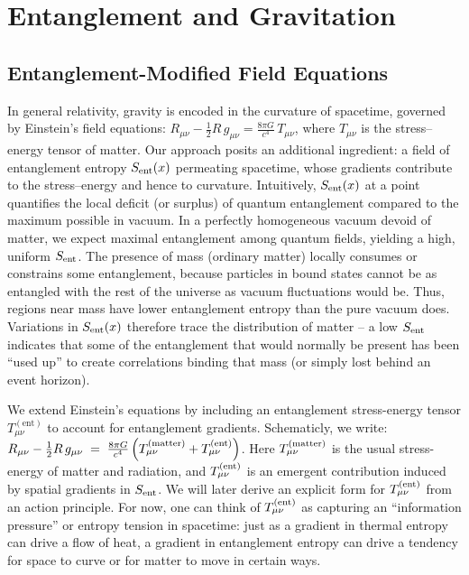 \documentclass[11pt]{article}
\begin{document}
\section{Entanglement and Gravitation}

\subsection{Entanglement-Modified Field Equations}

In general relativity, gravity is encoded in the curvature of spacetime, governed by Einstein’s field equations: 
$R_{\mu\nu} - \tfrac{1}{2}R\,g_{\mu\nu} = \frac{8\pi G}{c^4}\,T_{\mu\nu}$, 
where $T_{\mu\nu}$ is the stress–energy tensor of matter. Our approach posits an additional ingredient: a field of entanglement entropy $S_{\rm ent}(x)$ permeating spacetime, whose gradients contribute to the stress–energy and hence to curvature. Intuitively, $S_{\rm ent}(x)$ at a point quantifies the local deficit (or surplus) of quantum entanglement compared to the maximum possible in vacuum. In a perfectly homogeneous vacuum devoid of matter, we expect maximal entanglement among quantum fields, yielding a high, uniform $S_{\rm ent}$. The presence of mass (ordinary matter) locally consumes or constrains some entanglement, because particles in bound states cannot be as entangled with the rest of the universe as vacuum fluctuations would be. Thus, regions near mass have lower entanglement entropy than the pure vacuum does. Variations in $S_{\rm ent}(x)$ therefore trace the distribution of matter – a low $S_{\rm ent}$ indicates that some of the entanglement that would normally be present has been “used up” to create correlations binding that mass (or simply lost behind an event horizon).

We extend Einstein’s equations by including an entanglement stress-energy tensor $T_{\mu\nu}^{(\text{ent})}$ to account for entanglement gradients. Schematicly, we write: 
$R_{\mu\nu} - \tfrac{1}{2}R\,g_{\mu\nu} \;=\; \frac{8\pi G}{c^4}\,\Big( T_{\mu\nu}^{\rm (matter)} + T_{\mu\nu}^{\rm (ent)} \Big)$. 
Here $T_{\mu\nu}^{\rm (matter)}$ is the usual stress-energy of matter and radiation, and $T_{\mu\nu}^{\rm (ent)}$ is an emergent contribution induced by spatial gradients in $S_{\rm ent}$. We will later derive an explicit form for $T_{\mu\nu}^{\rm (ent)}$ from an action principle. For now, one can think of $T_{\mu\nu}^{\rm (ent)}$ as capturing an “information pressure” or entropy tension in spacetime: just as a gradient in thermal entropy can drive a flow of heat, a gradient in entanglement entropy can drive a tendency for space to curve or for matter to move in certain ways.
\end{document}
